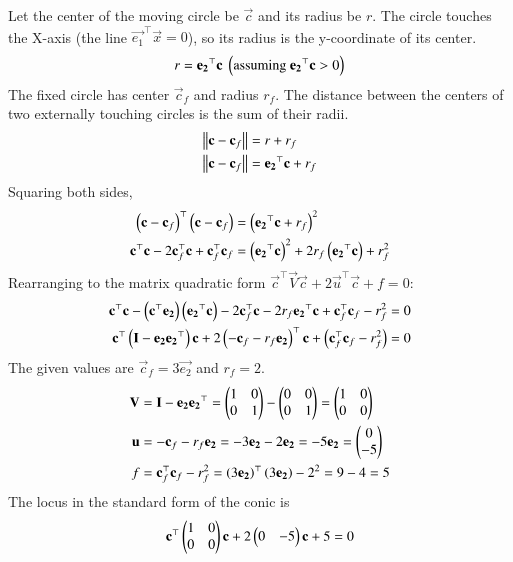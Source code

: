 \documentclass[journal]{IEEEtran}
\begin{document}
Let the center of the moving circle be $\vec{c}$ and its radius be $r$.
The circle touches the X-axis (the line $\vec{e_1}^\top\vec{x}=0$), so its radius is the y-coordinate of its center.
\begin{align}
    r = \mathbf{e_2}^\top\mathbf{c} \text{ } \left(\text{assuming } \mathbf{e_2}^\top\mathbf{c}>0\right)
\end{align}
The fixed circle has center $\vec{c}_f$ and radius $r_f$. The distance between the centers of two externally touching circles is the sum of their radii.
\begin{align}
    \left\lVert\mathbf{c}-\mathbf{c}_f\right\rVert &= r + r_f \\
    \left\lVert\mathbf{c}-\mathbf{c}_f\right\rVert &= \mathbf{e_2}^\top\mathbf{c} + r_f
\end{align}
Squaring both sides,
\begin{align}
    \left(\mathbf{c}-\mathbf{c}_f\right)^\top\left(\mathbf{c}-\mathbf{c}_f\right) &= \left(\mathbf{e_2}^\top\mathbf{c} + r_f\right)^2 \\
    \mathbf{c}^\top\mathbf{c} - 2\mathbf{c}_f^\top\mathbf{c} + \mathbf{c}_f^\top\mathbf{c}_f &= \left(\mathbf{e_2}^\top\mathbf{c}\right)^2 + 2r_f\left(\mathbf{e_2}^\top\mathbf{c}\right) + r_f^2
\end{align}
Rearranging to the matrix quadratic form $\vec{c}^\top\vec{V}\vec{c} + 2\vec{u}^\top\vec{c} + f = 0$:
\begin{align}
    \mathbf{c}^\top\mathbf{c} - \left(\mathbf{c}^\top\mathbf{e_2}\right)\left(\mathbf{e_2}^\top\mathbf{c}\right) - 2\mathbf{c}_f^\top\mathbf{c} - 2r_f\mathbf{e_2}^\top\mathbf{c} + \mathbf{c}_f^\top\mathbf{c}_f - r_f^2 = 0 \\
    \mathbf{c}^\top\left(\mathbf{I}-\mathbf{e_2}\mathbf{e_2}^\top\right)\mathbf{c} + 2\left(-\mathbf{c}_f - r_f\mathbf{e_2}\right)^\top\mathbf{c} + \left(\mathbf{c}_f^\top\mathbf{c}_f-r_f^2\right) = 0
\end{align}
The given values are $\vec{c}_f = 3\vec{e_2}$ and $r_f=2$.
\begin{align}
    \mathbf{V} &= \mathbf{I} - \mathbf{e_2}\mathbf{e_2}^\top = \begin{pmatrix}1 & 0 \\ 0 & 1\end{pmatrix} - \begin{pmatrix}0 & 0 \\ 0 & 1\end{pmatrix} = \begin{pmatrix}1 & 0 \\ 0 & 0\end{pmatrix} \\
    \mathbf{u} &= -\mathbf{c}_f - r_f\mathbf{e_2} = -3\mathbf{e_2} - 2\mathbf{e_2} = -5\mathbf{e_2} = \begin{pmatrix}0 \\ -5\end{pmatrix} \\
    f &= \mathbf{c}_f^\top\mathbf{c}_f - r_f^2 = \left(3\mathbf{e_2}\right)^\top\left(3\mathbf{e_2}\right) - 2^2 = 9 - 4 = 5
\end{align}
The locus in the standard form of the conic is
\begin{align}
    \mathbf{c}^\top\begin{pmatrix}1 & 0 \\ 0 & 0\end{pmatrix}\mathbf{c} + 2\begin{pmatrix}0 & -5\end{pmatrix}\mathbf{c} + 5 = 0
\end{align}
\end{document}
